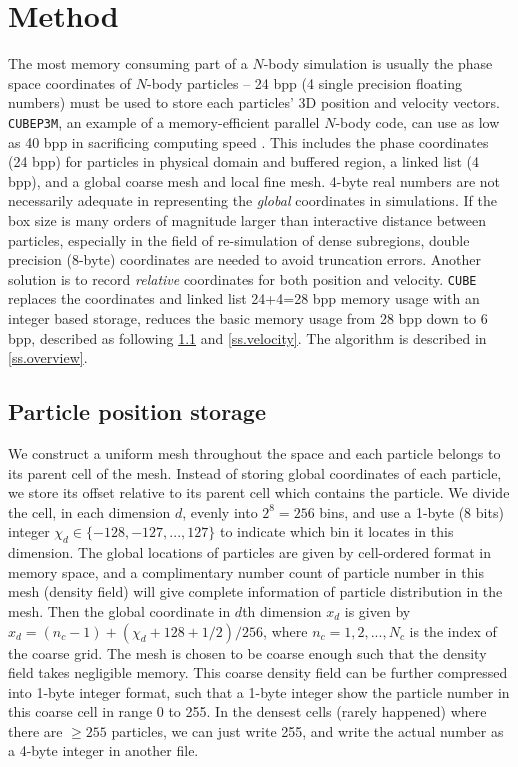 \documentclass[10pt,twocolumn,preprint]{emulateapj}
\begin{document}
\section{Method}\label{s.method}
The most memory consuming part of a $N$-body simulation is usually the phase space 
coordinates of $N$-body particles -- 24 bpp (4 single precision floating numbers) must 
be used to store each particles' 3D position and velocity vectors. {\tt CUBEP3M}, an 
example of a memory-efficient parallel $N$-body code, can use as low as 40 bpp in 
sacrificing computing speed \citep{2013MNRAS.436..540H}. This includes the phase 
coordinates (24 bpp) for particles in physical domain and buffered region, a linked 
list (4 bpp), and a global coarse mesh and local fine mesh. 4-byte real numbers are 
not necessarily adequate in representing the {\it global} coordinates in simulations.
If the box size is many orders of magnitude larger than interactive distance
between particles, especially in the field of re-simulation of dense subregions,
double precision (8-byte) coordinates are needed to avoid truncation errors.
Another solution is to record {\it relative} coordinates for both position and velocity.
{\tt CUBE} replaces the coordinates and linked list 24+4=28 bpp memory usage
with an integer based storage, reduces the basic memory usage from 28 bpp down to
6 bpp, described as following \ref{ss.position} and \ref{ss.velocity}. The algorithm is described in \ref{ss.overview}.

\subsection{Particle position storage}\label{ss.position}
We construct a uniform mesh throughout the space and each particle belongs 
to its parent cell of the mesh. Instead of storing global coordinates of 
each particle, we store its offset relative to its parent cell which 
contains the particle. We divide the cell, in each dimension $d$, evenly into 
$2^8=256$ bins, and use a 1-byte (8 bits) integer $\chi_d \in \{-128,-127,...,127\}$ to 
indicate which bin it locates in this dimension. The global locations of 
particles are given by cell-ordered format in memory space, and a 
complimentary number count of particle number in this mesh (density field) 
will give complete information of particle distribution in the mesh. Then 
the global coordinate in $d$th dimension $x_d$ is given by $x_d=(n_c-1)+
(\chi_d+128+1/2)/256$, where $n_c=1,2,...,N_c$ 
is the index of the coarse grid. The mesh 
is chosen to be coarse enough such that the density field takes negligible 
memory. This coarse density field can be further compressed into 1-byte 
integer format, such that a 1-byte integer show the particle number in this 
coarse cell in range 0 to 255. In the densest cells (rarely happened) where 
there are $\ge 255$ particles, we can just write 255, and write the actual 
number as a 4-byte integer in another file.
\end{document}
